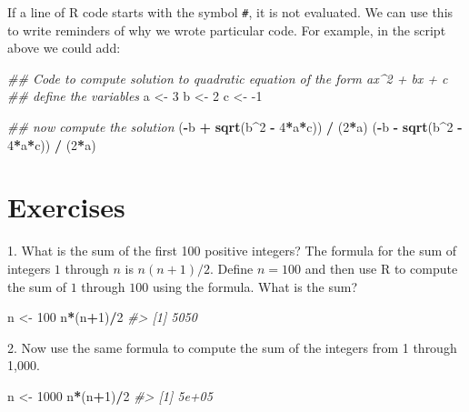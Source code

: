 \documentclass[
]{krantz}
\newenvironment{Shaded}{\begin{snugshade}}{\end{snugshade}}
\newcommand{\CommentTok}[1]{\textcolor[rgb]{0.37,0.37,0.37}{\textit{#1}}}
\newcommand{\DecValTok}[1]{\textcolor[rgb]{0.06,0.06,0.06}{#1}}
\newcommand{\KeywordTok}[1]{\textcolor[rgb]{0.27,0.27,0.27}{\textbf{#1}}}
\newcommand{\NormalTok}[1]{#1}
\newcommand{\OperatorTok}[1]{\textcolor[rgb]{0.43,0.43,0.43}{\textbf{#1}}}
\newcommand{\StringTok}[1]{\textcolor[rgb]{0.5,0.5,0.5}{#1}}
\begin{document}
If a line of R code starts with the symbol \texttt{\#}, it is not evaluated. We can use this to write reminders of why we wrote particular code. For example, in the script above we could add:

\begin{Shaded}
\begin{Highlighting}[]
\CommentTok{## Code to compute solution to quadratic equation of the form ax^2 + bx + c}
\CommentTok{## define the variables}
\NormalTok{a <-}\StringTok{ }\DecValTok{3} 
\NormalTok{b <-}\StringTok{ }\DecValTok{2}
\NormalTok{c <-}\StringTok{ }\DecValTok{-1}

\CommentTok{## now compute the solution}
\NormalTok{(}\OperatorTok{-}\NormalTok{b }\OperatorTok{+}\StringTok{ }\KeywordTok{sqrt}\NormalTok{(b}\OperatorTok{^}\DecValTok{2} \OperatorTok{-}\StringTok{ }\DecValTok{4}\OperatorTok{*}\NormalTok{a}\OperatorTok{*}\NormalTok{c)) }\OperatorTok{/}\StringTok{ }\NormalTok{(}\DecValTok{2}\OperatorTok{*}\NormalTok{a)}
\NormalTok{(}\OperatorTok{-}\NormalTok{b }\OperatorTok{-}\StringTok{ }\KeywordTok{sqrt}\NormalTok{(b}\OperatorTok{^}\DecValTok{2} \OperatorTok{-}\StringTok{ }\DecValTok{4}\OperatorTok{*}\NormalTok{a}\OperatorTok{*}\NormalTok{c)) }\OperatorTok{/}\StringTok{ }\NormalTok{(}\DecValTok{2}\OperatorTok{*}\NormalTok{a)}
\end{Highlighting}
\end{Shaded}

\hypertarget{exercises}{%
\section{Exercises}\label{exercises}}

1. What is the sum of the first 100 positive integers? The formula for the sum of integers \(1\) through \(n\) is \(n(n+1)/2\). Define \(n=100\) and then use R to compute the sum of \(1\) through \(100\) using the formula. What is the sum?

\begin{Shaded}
\begin{Highlighting}[]
\NormalTok{n <-}\StringTok{ }\DecValTok{100}
\NormalTok{n}\OperatorTok{*}\NormalTok{(n}\OperatorTok{+}\DecValTok{1}\NormalTok{)}\OperatorTok{/}\DecValTok{2}
\CommentTok{#> [1] 5050}
\end{Highlighting}
\end{Shaded}

2. Now use the same formula to compute the sum of the integers from 1 through 1,000.

\begin{Shaded}
\begin{Highlighting}[]
\NormalTok{n <-}\StringTok{ }\DecValTok{1000}
\NormalTok{n}\OperatorTok{*}\NormalTok{(n}\OperatorTok{+}\DecValTok{1}\NormalTok{)}\OperatorTok{/}\DecValTok{2}
\CommentTok{#> [1] 5e+05}
\end{Highlighting}
\end{Shaded}
\end{document}
